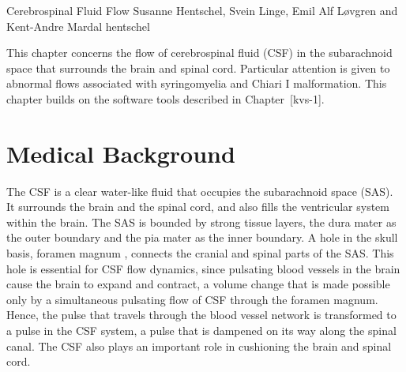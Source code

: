               {Cerebrospinal Fluid Flow}
              {Susanne Hentschel, Svein Linge, Emil Alf L{\o}vgren and Kent-Andre Mardal}
              {hentschel}


This chapter concerns the flow of cerebrospinal fluid (CSF) 
in the subarachnoid space that surrounds the brain and spinal cord. 
Particular attention is given to abnormal flows associated with syringomyelia and Chiari I malformation. 
This chapter builds on the software tools described in Chapter~[kvs-1]. 




\section{Medical Background}

The CSF is a clear water-like fluid that occupies the subarachnoid space (SAS). It surrounds the brain and the spinal cord, and also fills the ventricular system within the brain. The SAS is bounded by strong tissue layers, the dura mater as the outer boundary and the pia mater as the inner boundary. A hole in the skull basis, foramen magnum , connects the cranial and spinal parts of the SAS. This hole is essential for CSF flow dynamics, since pulsating blood vessels in the brain cause the brain to expand and contract, a volume change that is made possible only by a simultaneous pulsating flow of CSF through the foramen magnum. Hence, the pulse that travels through the blood vessel network is transformed to a pulse in the CSF system, a pulse that is dampened on its way along the spinal canal. The CSF also plays an important role in cushioning the brain and spinal cord. 



